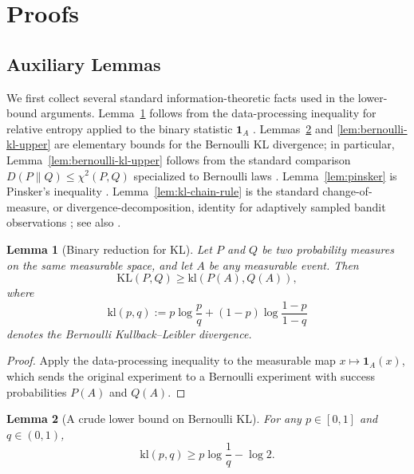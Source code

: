 \documentclass[11pt]{article}
\newtheorem{lemma}{Lemma}
\begin{document}
\section{Proofs}
\subsection{Auxiliary Lemmas}\label{sec: Auxiliary Lemmas}

We first collect several standard information-theoretic facts used in the lower-bound
arguments. Lemma~\ref{lem:binary-reduction} follows from the data-processing inequality for relative entropy
applied to the binary statistic \(\mathbf{1}_A\)
\parencite[see, e.g.,][]{coverThomas2006,lattimoreSzepesvari2020}.
Lemmas~\ref{lem:bernoulli-kl-lower} and \ref{lem:bernoulli-kl-upper} are elementary bounds for the Bernoulli KL divergence; in particular,
Lemma~\ref{lem:bernoulli-kl-upper} follows from the standard comparison \(D(P\|Q)\le \chi^2(P,Q)\) specialized
to Bernoulli laws \parencite[see, e.g.,][]{tsybakov2009,lattimoreSzepesvari2020}.
Lemma~\ref{lem:pinsker} is Pinsker's inequality \parencite{pinsker1964,tsybakov2009}. Lemma~\ref{lem:kl-chain-rule} is the
standard change-of-measure, or divergence-decomposition, identity for adaptively sampled
bandit observations \parencite[see, e.g., Lemma~1 of][]{KaufmannCappeGarivier2016};
see also \textcite[Chapter~15]{lattimoreSzepesvari2020}.

\begin{lemma}[Binary reduction for KL]
\label{lem:binary-reduction}
Let $P$ and $Q$ be two probability measures on the same measurable space, and
let $A$ be any measurable event. Then
\[
\mathrm{KL}(P,Q)\ge \mathrm{kl}(P(A),Q(A)),
\]
where
\[
\mathrm{kl}(p,q):=p\log\frac pq+(1-p)\log\frac{1-p}{1-q}
\]
denotes the Bernoulli Kullback--Leibler divergence.
\end{lemma}

\begin{proof}
Apply the data-processing inequality to the measurable map
$x\mapsto \mathbf 1_A(x)$, which sends the original experiment to a Bernoulli
experiment with success probabilities $P(A)$ and $Q(A)$.
\end{proof}

\begin{lemma}[A crude lower bound on Bernoulli KL]
\label{lem:bernoulli-kl-lower}
For any $p\in[0,1]$ and $q\in(0,1)$,
\[
\mathrm{kl}(p,q)\ge p\log\frac1q-\log 2.
\]
\end{lemma}
\end{document}
